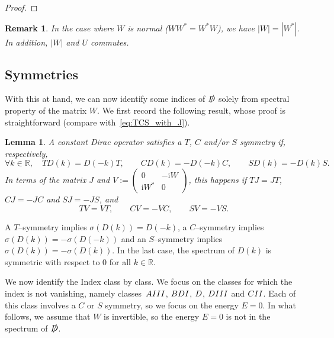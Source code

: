 \documentclass[11pt]{amsart}
\numberwithin{equation}{section} %
\newtheorem{remark}[theorem]{Remark}
\newtheorem{lemma}[theorem]{Lemma}
\newcommand\1{{\mathds 1}}
\def\R{{\mathbb R}}
\def\ri{{\mathrm{i}}}
\def\rAIII{{\rm AIII}}
\def\rBDI{{\rm BDI}}
\def\rD{{\rm D}}
\def\rDIII{{\rm DIII}}
\def\rCII{{\rm CII}}
\def\Dirac{\slashed{D}} %
\begin{document}
\begin{proof}

\end{proof}

\begin{remark}\label{rem:normal_W}
    In the case where $W$ is normal ($W W^* = W^* W$), we have $| W | = | W^* |$. In addition, $| W |$ and $U$ commutes.
\end{remark}

\subsection{Symmetries}

With this at hand, we can now identify some indices of $\Dirac$ solely from spectral property of the matrix $W$. We first record the following result, whose proof is straightforward (compare with~\eqref{eq:TCS_with_J}).
\begin{lemma} \label{lem:TCS_Symmetry_forV}
    A constant Dirac operator satisfies a $T$, $C$ and/or $S$ symmetry if, respectively,
    \[
        \forall k \in \R, \quad T D(k) = D(-k) T, \qquad C D(k) = -D(-k) C, \qquad S D(k) = -D(k) S.
    \]
    In terms of the matrix $J$ and $V := \begin{pmatrix}
        0 & -\ri W \\ \ri W^* & 0
    \end{pmatrix}$, this happens if $T J = J T$, $C J = -J C$ and $S J = -J S$, and
    \[
        T V = VT, \qquad CV = - VC, \qquad SV = - VS.
    \]
\end{lemma}
A $T$--symmetry implies $\sigma( D(k)) = D(-k)$, a $C$--symmetry implies $\sigma (D(k))  = - \sigma (D(-k))$ and an $S$--symmetry implies $\sigma (D(k)) = - \sigma (D(k))$. In the last case, the spectrum of $D(k)$ is symmetric with respect to $0$ for all $k \in \R$.

\medskip

We now identify the Index class by class. We focus on the classes for which the index is not vanishing, namely classes~$\rAIII$, $\rBDI$, $\rD$, $\rDIII$ and $\rCII$. Each of this class involves a $C$ or $S$ symmetry, so we focus on the energy $E = 0$. In what follows, we assume that $W$ is invertible, so the energy $E = 0$ is not in the spectrum of $\Dirac$.

\end{document}
